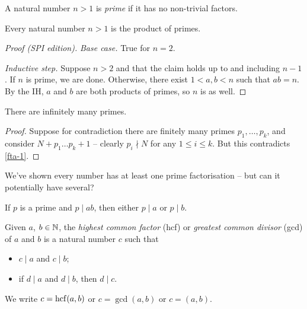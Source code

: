 \documentclass{../template/note}
\begin{document}
    \begin{definition}
        A natural number \(n > 1\) is \emph{prime} if it has no non-trivial factors.
    \end{definition}

    
    \begin{proposition}
        Every natural number \(n > 1\) is the product of primes.
    \end{proposition}
    
    \begin{proof}[Proof (SPI edition)]

        \emph{Base case.} True for \(n=2\).

        \emph{Inductive step.} Suppose \(n > 2\) and that the claim holds up to and including \(n-1\). If \(n\) is prime, we are done. Otherwise, there exist \(1 < a, b < n\) such that \(ab = n\). By the IH, \(a\) and \(b\) are both products of primes, so \(n\) is as well.
    \end{proof}
    
    
    \begin{theorem}[Euclid]
        There are infinitely many primes.
    \end{theorem}
    
    \begin{proof}
        Suppose for contradiction there are finitely many primes \(p_1, \dots, p_k\), and consider \(N + p_1\dots p_k + 1\) -- clearly \(p_i \nmid N\) for any \(1 \leq i \leq k\). But this contradicts \cref{fta-1}.
    \end{proof}
    
    We've shown every number has at least one prime factorisation -- but can it potentially have several?

    \begin{proposition}
        If \(p\) is a prime and \(p \mid ab\), then either \(p \mid a\) or \(p \mid b\).
        \label{euclid-lemma}
    \end{proposition}
    
    \begin{definition}
        Given \(a\), \(b \in \mathbb N\), the \emph{highest common factor} (hcf) or \emph{greatest common divisor} (gcd) of \(a\) and \(b\) is a natural number \(c\) such that
        \begin{itemize}
            \item \(c \mid a\) and \(c \mid b\);
            \item if \(d \mid a\) and \(d \mid b\), then \(d \mid c\).
        \end{itemize}
        We write \(c = \operatorname{hcf}(a, b)\) or \(c = \gcd(a, b)\) or \(c = (a, b)\).        
    \end{definition}
    
\end{document}
